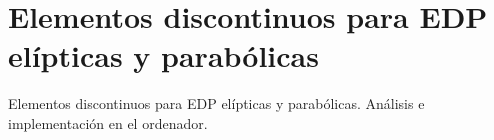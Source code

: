 
\section{Elementos discontinuos para EDP elípticas y parabólicas}

\begin{contenidos}
Elementos discontinuos para EDP elípticas y parabólicas. Análisis e implementación en el ordenador.
\end{contenidos}



